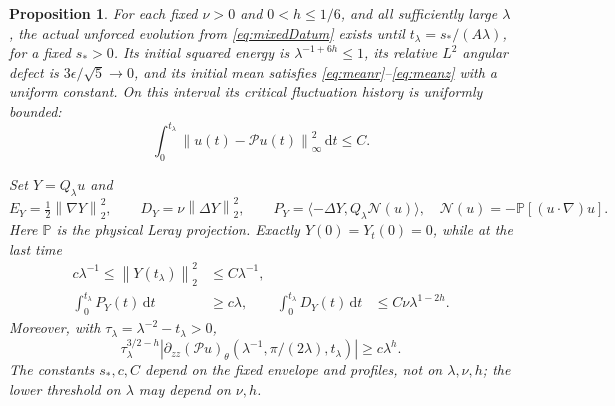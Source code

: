 \documentclass[11pt]{article}
\newtheorem{proposition}[theorem]{Proposition}
\theoremstyle{remark}
\newcommand{\PP}{\mathcal P}
\newcommand{\dd}{\,\mathrm d}
\newcommand{\norm}[1]{\left\lVert#1\right\rVert}
\begin{document}
\begin{proposition}\label{prop:mixedParents}
For each fixed $\nu>0$ and $0<h\leq1/6$, and all sufficiently large
$\lambda$, the actual unforced evolution from \eqref{eq:mixedDatum}
exists until $t_\lambda=s_*/(A\lambda)$, for a fixed $s_*>0$.
Its initial squared energy is $\lambda^{-1+6h}\leq1$, its relative
$L^2$ angular defect is $3\epsilon/\sqrt5\to0$, and its initial mean
satisfies \eqref{eq:meanr}--\eqref{eq:meanz} with a uniform constant.
On this interval its critical fluctuation history is uniformly bounded:
\[
 \int_0^{t_\lambda}\norm{u(t)-\PP u(t)}_\infty^2\dd t\leq C.
\]

Set $Y=Q_\lambda u$ and
\[
 E_Y=\tfrac12\norm{\nabla Y}_2^2,\qquad
 D_Y=\nu\norm{\Delta Y}_2^2,\qquad
 P_Y=\langle-\Delta Y,Q_\lambda\mathcal N(u)\rangle,
 \quad \mathcal N(u)=-\mathbb P[(u\cdot\nabla)u].
\]
Here $\mathbb P$ is the physical Leray projection. Exactly
$Y(0)=Y_t(0)=0$, while at the last time
\begin{align}
 c\lambda^{-1}\leq\norm{Y(t_\lambda)}_2^2
                         &\leq C\lambda^{-1},\label{eq:mixedEnergy}\\
 \int_0^{t_\lambda}P_Y(t)\dd t&\geq c\lambda,
 &\int_0^{t_\lambda}D_Y(t)\dd t
                         &\leq C\nu\lambda^{1-2h}.
 \label{eq:mixedWork}
\end{align}
Moreover, with $\tau_\lambda=\lambda^{-2}-t_\lambda>0$,
\begin{equation}\label{eq:mixedGeometry}
 \tau_\lambda^{3/2-h}
 \left|\partial_{zz}(\PP u)_\theta
       (\lambda^{-1},\pi/(2\lambda),t_\lambda)\right|
                                      \geq c\lambda^h.
\end{equation}
The constants $s_*,c,C$ depend on the fixed envelope and profiles,
not on $\lambda,\nu,h$; the lower threshold on $\lambda$ may depend
on $\nu,h$.
\end{proposition}
\end{document}
